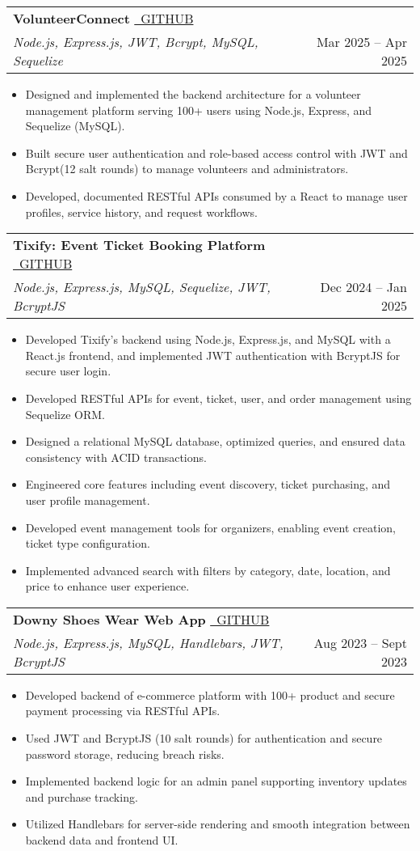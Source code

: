 \documentclass[letterpaper,10.5pt]{article}
\makeatletter
\newcommand{\resumeItem}[1]{
  \item\small{
    {#1 \vspace{-1.5pt}}
  }
}
\newcommand{\resumeProjectHeading}[2]{
    \item
    \begin{tabular*}{0.97\textwidth}{l@{\extracolsep{\fill}}r}
      \small#1 & #2 \\
    \end{tabular*}\vspace{-7pt}
}
\newcommand{\resumeItemListStart}{\begin{itemize}}
\newcommand{\resumeItemListEnd}{\end{itemize}\vspace{-9pt}}
\makeatother
\begin{document}
\resumeProjectHeading
  {\textbf{VolunteerConnect} \hspace{0.5em} \href{https://github.com/Bhavish511/Volunteer-Connect.git}{\textnormal{\faGithub~GITHUB}} \\
  \emph{Node.js, Express.js, JWT, Bcrypt, MySQL, Sequelize}}{Mar 2025 -- Apr 2025}
\resumeItemListStart
  \resumeItem{Designed and implemented the backend architecture for a volunteer management platform serving 100+ users using Node.js, Express, and Sequelize (MySQL).}
  \resumeItem{Built secure user authentication and role-based access control with JWT and Bcrypt(12 salt rounds) to manage volunteers and administrators.}
  \resumeItem{Developed, documented RESTful APIs consumed by a React to manage user profiles, service history, and request workflows.}
\resumeItemListEnd
\resumeProjectHeading
  {\textbf{Tixify: Event Ticket Booking Platform} \hspace{0.5em} \href{https://github.com/Bhavish511/Tixify.git}{\textnormal{\faGithub~GITHUB}} \\
  \emph{Node.js, Express.js, MySQL, Sequelize, JWT, BcryptJS}}{Dec 2024 -- Jan 2025}
\resumeItemListStart
  \resumeItem{Developed Tixify's backend using Node.js, Express.js, and MySQL with a React.js frontend, and implemented JWT authentication with BcryptJS for secure user login.}
  \resumeItem{Developed RESTful APIs for event, ticket, user, and order management using Sequelize ORM.}
  \resumeItem{Designed a relational MySQL database, optimized queries, and ensured data consistency with ACID transactions.}
  \resumeItem{Engineered core features including event discovery, ticket purchasing, and user profile management.}
  \resumeItem{Developed event management tools for organizers, enabling event creation, ticket type configuration.}
  \resumeItem{Implemented advanced search with filters by category, date, location, and price to enhance user experience.}
\resumeItemListEnd
\resumeProjectHeading
  {\textbf{Downy Shoes Wear Web App} \hspace{0.5em} \href{https://github.com/Bhavish511/Database-project-.git}{\textnormal{\faGithub~GITHUB}} \\
  \emph{Node.js, Express.js, MySQL, Handlebars, JWT, BcryptJS}}{Aug 2023 -- Sept 2023}
\resumeItemListStart
  \resumeItem{Developed backend of e-commerce platform with 100+ product and secure payment processing via RESTful APIs.}
  \resumeItem{Used JWT and BcryptJS (10 salt rounds) for authentication and secure password storage, reducing breach risks.}
  \resumeItem{Implemented backend logic for an admin panel supporting inventory updates and purchase tracking.}
  \resumeItem{Utilized Handlebars for server-side rendering and smooth integration between backend data and frontend UI.}
\resumeItemListEnd
\end{document}
